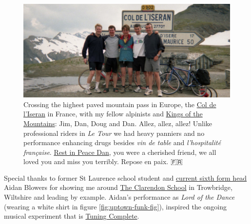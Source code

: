 \documentclass[
]{book}
\begin{document}
\begin{figure}

{\centering \includegraphics[width=1\linewidth]{images/kings-of-the-mountains-col-deliseran} 

}

\caption{Crossing the highest paved mountain pass in Europe, the \href{https://en.wikipedia.org/wiki/Col_de_l\%27Iseran}{Col de l'Iseran} in France, with my fellow alpinists and \href{https://en.wikipedia.org/wiki/King_of_the_Mountains}{Kings of the Mountains}: Jim, Dan, Doug and Dan. Allez, allez, allez! Unlike professional riders in \emph{Le Tour} we had heavy panniers and no performance enhancing drugs besides \emph{vin de table} and \emph{l'hospitalité française}. \href{https://www.wiltshiretimes.co.uk/announcements/deaths/deaths/14828732.Daniel_Feane/}{Rest in Peace Dan}, you were a cherished friend, we all loved you and miss you terribly. Repose en paix. 🇫🇷}\label{fig:bradlads-fig}
\end{figure}



Special thanks to former St Laurence school student and \href{https://st-laurence.com/sixth-form}{current sixth form head} Aidan Blowers for showing me around \href{https://en.wikipedia.org/wiki/The_Clarendon_Academy}{The Clarendon School} in Trowbridge, Wiltshire and leading by example. Aidan's performance as \emph{Lord of the Dance} (wearing a white shirt in figure \ref{fig:uptown-funk-fig}), inspired the ongoing musical experiment that is \href{https://personalpages.manchester.ac.uk/staff/duncan.hull/research.html\#tuningcomplete}{Tuning Complete}.
\end{document}
